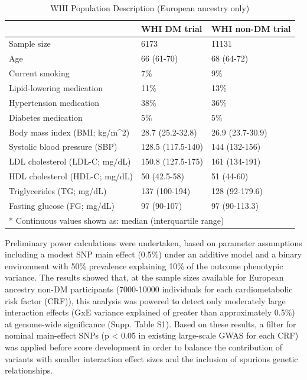 \documentclass[]{article}
\begin{document}
\begin{longtable}{lll}
\caption{\label{tab:pop-description}WHI Population Description (European ancestry only)}\\
\toprule
  & WHI DM trial & WHI non-DM trial\\
\midrule
Sample size & 6173 & 11131\\
Age & 66 (61-70) & 68 (64-72)\\
Current smoking & 7\% & 9\%\\
Lipid-lowering medication & 11\% & 13\%\\
Hypertension medication & 38\% & 36\%\\
\addlinespace
Diabetes medication & 5\% & 5\%\\
Body mass index (BMI; kg/m\textasciicircum{}2) & 28.7 (25.2-32.8) & 26.9 (23.7-30.9)\\
Systolic blood pressure (SBP) & 128.5 (117.5-140) & 144 (132-156)\\
LDL cholesterol (LDL-C; mg/dL) & 150.8 (127.5-175) & 161 (134-191)\\
HDL cholesterol (HDL-C; mg/dL) & 50 (42.5-58) & 51 (44-60)\\
\addlinespace
Triglycerides (TG; mg/dL) & 137 (100-194) & 128 (92-179.6)\\
Fasting glucose (FG; mg/dL) & 97 (90-107) & 97 (90-113.3)\\
\bottomrule
\multicolumn{3}{l}{* Continuous values shown as: median (interquartile range)}\\
\end{longtable}

Preliminary power calculations were undertaken, based on parameter
assumptions including a modest SNP main effect (0.5\%) under an additive
model and a binary environment with 50\% prevalence explaining 10\% of
the outcome phenotypic variance. The results showed that, at the sample
sizes available for European ancestry non-DM participants (7000-10000
individuals for each cardiometabolic risk factor (CRF)), this analysis
was powered to detect only moderately large interaction effects (GxE
variance explained of greater than approximately 0.5\%) at genome-wide
significance (Supp. Table S1). Based on these results, a filter for
nominal main-effect SNPs (p \textless{} 0.05 in existing large-scale
GWAS for each CRF) was applied before score development in order to
balance the contribution of variants with smaller interaction effect
sizes and the inclusion of spurious genetic relationships.
\end{document}
